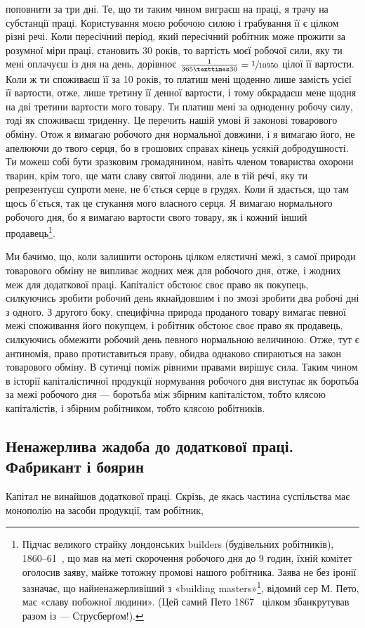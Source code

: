 \parcont{}  %
поповнити за три дні. Те, що ти таким чином виграєш на праці,
я трачу на субстанції праці. Користування моєю робочою силою
і грабування її є цілком різні речі. Коли пересічний період,
який пересічний робітник може прожити за розумної міри праці,
становить 30 років, то вартість моєї робочої сили, яку ти мені
оплачуєш із дня на день, дорівнює $\frac{1}{365×30} = \sfrac{1}{10950}$ цілої її
вартости. Коли ж ти споживаєш її за 10 років, то платиш мені
щоденно лише  замість  усієї її вартости, отже, лише
третину її денної вартости, і тому обкрадаєш мене щодня на дві
третини вартости мого товару. Ти платиш мені за одноденну
робочу силу, тоді як споживаєш триденну. Це перечить нашій
умові й законові товарового обміну. Отож я вимагаю робочого
дня нормальної довжини, і я вимагаю його, не апелюючи до твого
серця, бо в грошових справах кінець усякій добродушності.
Ти можеш собі бути зразковим громадянином, навіть членом
товариства охорони тварин, крім того, ще мати славу святої
людини, але в тій речі, яку ти репрезентуєш супроти мене, не
б’ється серце в грудях. Коли й здається, що там щось б’ється,
так це стукання мого власного серця. Я вимагаю нормального
робочого дня, бо я вимагаю вартости свого товару, як і кожний
інший продавець\footnote{
Підчас великого страйку лондонських builders (будівельних робітників),
1860--61~, що мав на меті скорочення робочого дня до 9 годин,
їхній комітет оголосив заяву, майже тотожну промові нашого робітника.
Заява не без іронії зазначає, що найненажерливіший з «building
masters»\footnote*{— будівельних підприємців. \emph{Ред.}
}, відомий сер М. Пето, має «славу побожної людини». (Цей
самий Пето 1867~ цілком збанкрутував разом із — Струсберґом!).
}.

Ми бачимо, що, коли залишити осторонь цілком елястичні
межі, з самої природи товарового обміну не випливає жодних
меж для робочого дня, отже, і жодних меж для додаткової праці.
Капіталіст обстоює своє право як покупець, силкуючись зробити
робочий день якнайдовшим і по змозі зробити два робочі дні з
одного. З другого боку, специфічна природа проданого товару
вимагає певної межі споживання його покупцем, і робітник обстоює
своє право як продавець, силкуючись обмежити робочий день
певного нормальною величиною. Отже, тут є антиномія, право
протиставиться праву, обидва однаково спираються на закон
товарового обміну. В сутичці поміж рівними правами вирішує
сила. Таким чином в історії капіталістичної продукції нормування
робочого дня виступає як боротьба за межі робочого дня —
боротьба між збірним капіталістом, тобто клясою капіталістів,
і збірним робітником, тобто клясою робітників.

\subsection{Ненажерлива жадоба до додаткової праці. Фабрикант і боярин}

Капітал не винайшов додаткової праці. Скрізь, де якась частина
суспільства має монополію на засоби продукції, там робітник,
\parbreak{}  %
